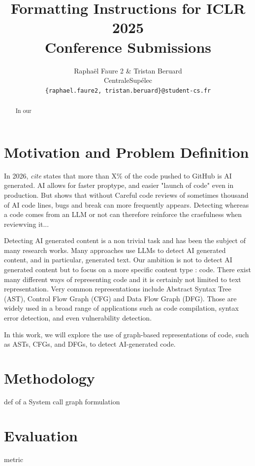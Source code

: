 \documentclass{article}
\title{Formatting Instructions for ICLR 2025 \\ Conference Submissions}
\author{Raphaël Faure 2 \& Tristan Beruard \\
CentraleSupélec \\
\texttt{\{raphael.faure2, tristan.beruard\}@student-cs.fr} \\
}
\begin{document}
\maketitle

\begin{abstract}

In our  

\end{abstract}

\section{Motivation and Problem Definition}

In 2026, \textit{cite} states that more than X\% of the code pushed to GitHub is AI generated. 
AI allows for faster proptype, and easier "launch of code" even in production. But \cite{} shows that without 
Careful code reviews of sometimes thousand of AI code lines, bugs and break can more frequently appears. 
Detecting whereas a code comes from an LLM or not can therefore reinforce the craefulness when reviewving it... 

Detecting AI generated content is a non trivial task and has been the subject of many research works. Many approaches use LLMs to detect AI generated content, and in particular, generated text.
Our ambition is not to detect AI generated content but to focus on a more specific content type : code.
There exist many different ways of representing code and it is certainly not limited to text representation. 
Very common representations include Abstract Syntax Tree (AST), Control Flow Graph (CFG) and Data Flow Graph (DFG). Those are widely
used in a broad range of applications such as code compilation, syntax error detection, and even vulnerability detection.

In this work, we will explore the use of graph-based representations of code, such as ASTs, CFGs, and DFGs, to detect AI-generated code.

\section{Methodology}


def of a System call 
graph formulation 

\section{Evaluation}

metric 
\end{document}
